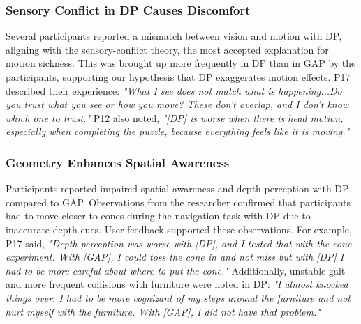 
\subsubsection{\textbf{Sensory Conflict in DP Causes Discomfort}}
Several participants reported a mismatch between vision and motion with DP, aligning with the sensory-conflict theory, the most accepted explanation for motion sickness. This was brought up more frequently in DP than in GAP by the participants, supporting our hypothesis that DP exaggerates motion effects. P17 described their experience: \textit{"What I see does not match what is happening...Do you trust what you see or how you move? These don't overlap, and I don't know which one to trust."} P12 also noted, \textit{"[DP] is worse when there is head motion, especially when completing the puzzle, because everything feels like it is moving."} 

\subsubsection{\textbf{Geometry Enhances Spatial Awareness}}
Participants reported impaired spatial awareness and depth perception with DP compared to GAP. Observations from the researcher confirmed that participants had to move closer to cones during the navigation task with DP due to inaccurate depth cues. User feedback supported these observations. For example, P17 said, \textit{"Depth perception was worse with [DP], and I tested that with the cone experiment. With [GAP], I could toss the cone in and not miss but with [DP] I had to be more careful about where to put the cone."} Additionally, unstable gait and more frequent collisions with furniture were noted in DP: 
\textit{"I almost knocked things over. I had to be more cognizant of my steps around the furniture and not hurt myself with the furniture. With [GAP], I did not have that problem."}

